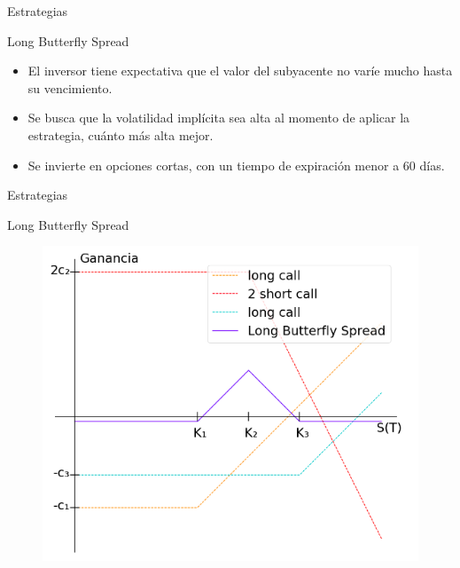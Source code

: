 \documentclass{beamer}
\begin{document}
\begin{frame}{Estrategias}

    \begin{block}{Long Butterfly Spread}

        \begin{itemize}

            \item El inversor tiene expectativa que el valor del subyacente no var\'ie mucho hasta su vencimiento.
            \item Se busca que la volatilidad impl\'icita sea alta al momento de aplicar la estrategia, cu\'anto m\'as alta mejor.
            \item Se invierte en opciones cortas, con un tiempo de expiraci\'on menor a 60 d\'ias.


        \end{itemize}
    \end{block}

\end{frame}



\begin{frame}{Estrategias}

    \begin{block}{Long Butterfly Spread}

        \begin{figure}
            \includegraphics[scale=0.45]{butterfly}
        \end{figure}

    \end{block}

\end{frame}
\end{document}
